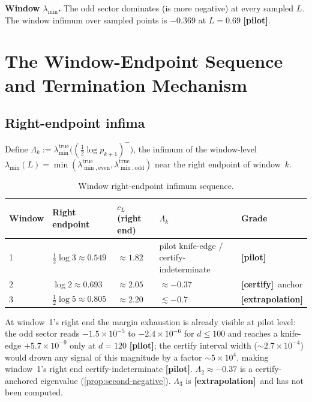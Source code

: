 \documentclass[12pt,a4paper]{amsart}
\theoremstyle{plain}
\theoremstyle{definition}
\newcommand{\lmin}{\lambda_{\min}}
\newcommand{\ltrue}{\lambda_{\min}^{\mathrm{true}}}
\newcommand{\ltrues}[1]{\lambda_{\min,\mathrm{#1}}^{\mathrm{true}}}
\newcommand{\cL}{c_L}
\newcommand{\certify}{\textbf{[certify]}}
\newcommand{\pilot}{\textbf{[pilot]}}
\newcommand{\extrap}{\textbf{[extrapolation]}}
\begin{document}
\textbf{Window $\lmin$.}  The odd sector dominates (is more negative) at
every sampled $L$.  The window infimum over sampled points is $-0.369$ at
$L=0.69$ \pilot.

\section{The Window-Endpoint Sequence and Termination Mechanism}
\label{sec:trend}

\subsection{Right-endpoint infima}

Define $\Lambda_k := \ltrue\!\bigl((\tfrac12\log p_{k+1})^-\bigr)$, the
infimum of the window-level $\lambda_{\min}(L) = \min(\ltrues{even},
\ltrues{odd})$ near the right endpoint of window~$k$.

\begin{table}[h]
\centering
\caption{Window right-endpoint infimum sequence.}
\label{tab:sequence}
\small\setlength{\tabcolsep}{4pt}
\begin{tabular}{@{}lllp{}l@{}}
\toprule
Window & Right endpoint & $\cL$ (right end) & $\Lambda_k$ & Grade \\
\midrule
1 & $\tfrac12\log 3 \approx 0.549$ & $\approx 1.82$ &
  pilot knife-edge / certify-indeterminate & \pilot \\
2 & $\log 2 \approx 0.693$ & $\approx 2.05$ &
  $\approx -0.37$ & \certify~anchor \\
3 & $\tfrac12\log 5 \approx 0.805$ & $\approx 2.20$ &
  $\lesssim -0.7$ & \extrap \\
\bottomrule
\end{tabular}
\end{table}

At window~1's right end the margin exhaustion is already visible at pilot level:
the odd sector reads $-1.5\times10^{-5}$ to $-2.4\times10^{-6}$ for $d \le 100$
and reaches a knife-edge $+5.7\times10^{-9}$ only at $d=120$ \pilot; the certify
interval width ($\sim 2.7\times10^{-4}$) would drown any signal of this magnitude
by a factor $\sim 5\times10^4$, making window~1's right end certify-indeterminate
\pilot.  $\Lambda_2 \approx -0.37$ is a certify-anchored eigenvalue
(\cref{prop:second-negative}).  $\Lambda_3$ is \extrap\ and has not been
computed.
\end{document}
